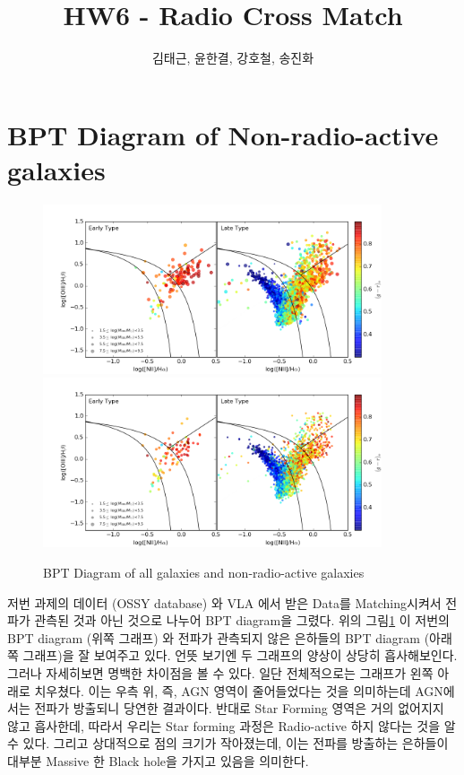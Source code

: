 \documentclass[a4paper,11pt]{article}
\title{\boldmath HW6 - Radio Cross Match}
\author{김태근, 윤한결, 강호철, 송진화}
\affiliation{연세대학교 천문우주학과 F조}
\begin{document}
 
\maketitle
\flushbottom

\section{BPT Diagram of Non-radio-active galaxies}


\begin{figure}[h]
\centering
\includegraphics[height=50mm, width=100mm]{BPT.png}
\hfill
\includegraphics[height=50mm, width=100mm]{BPT_nonradio.png}
\caption{\label{fig:i} BPT Diagram of all galaxies and non-radio-active galaxies}
\end{figure}

저번 과제의 데이터 (OSSY database) 와 VLA 에서 받은 Data를 Matching시켜서 전파가 관측된 것과 아닌 것으로 나누어 BPT diagram을 그렸다. 위의 그림\ref{fig:i} 이 
저번의 BPT diagram (위쪽 그래프) 와 전파가 관측되지 않은 은하들의 BPT diagram (아래쪽 그래프)을 잘 보여주고 있다. 언뜻 보기엔 두 그래프의 양상이 상당히 흡사해보인다.
그러나 자세히보면 명백한 차이점을 볼 수 있다. 일단 전체적으로는 그래프가 왼쪽 아래로 치우쳤다. 이는 우측 위, 즉, AGN 영역이 줄어들었다는 것을 의미하는데
AGN에서는 전파가 방출되니 당연한 결과이다. 반대로 Star Forming 영역은 거의 없어지지 않고 흡사한데, 따라서 우리는 Star forming 과정은 Radio-active 하지 않다는 것을 알 수 있다.
그리고 상대적으로 점의 크기가 작아졌는데, 이는 전파를 방출하는 은하들이 대부분 Massive 한 Black hole을 가지고 있음을 의미한다. 
\end{document}
